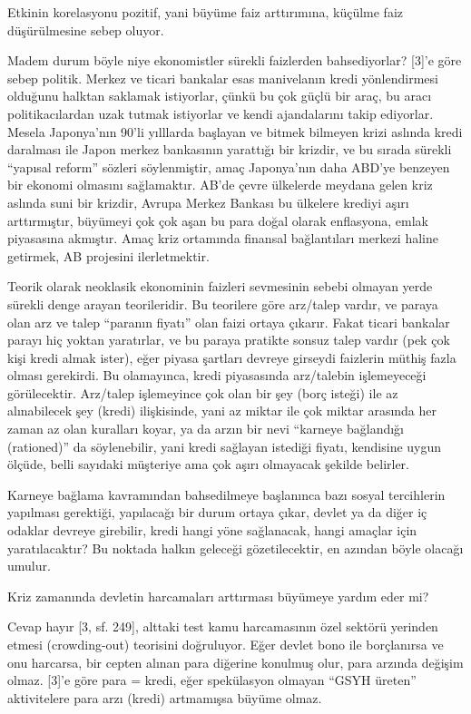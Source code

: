 \documentclass[12pt,fleqn]{article}\usepackage{../../common}
\begin{document}
Etkinin korelasyonu pozitif, yani büyüme faiz arttırımına, küçülme faiz
düşürülmesine sebep oluyor.

Madem durum böyle niye ekonomistler sürekli faizlerden bahsediyorlar? [3]'e
göre sebep politik. Merkez ve ticari bankalar esas manivelanın kredi
yönlendirmesi olduğunu halktan saklamak istiyorlar, çünkü bu çok güçlü bir
araç, bu aracı politikacılardan uzak tutmak istiyorlar ve kendi
ajandalarını takip ediyorlar. Mesela Japonya'nın 90'li yılllarda başlayan
ve bitmek bilmeyen krizi aslında kredi daralması ile Japon merkez
bankasının yarattığı bir krizdir, ve bu sırada sürekli ``yapısal reform''
sözleri söylenmiştir, amaç Japonya'nın daha ABD'ye benzeyen bir ekonomi
olmasını sağlamaktır. AB'de çevre ülkelerde meydana gelen kriz aslında suni
bir krizdir, Avrupa Merkez Bankası bu ülkelere krediyi aşırı arttırmıştır,
büyümeyi çok çok aşan bu para doğal olarak enflasyona, emlak piyasasına
akmıştır. Amaç kriz ortamında finansal bağlantıları merkezi haline
getirmek, AB projesini ilerletmektir.

Teorik olarak neoklasik ekonominin faizleri sevmesinin sebebi olmayan yerde
sürekli denge arayan teorileridir. Bu teorilere göre arz/talep vardır, ve
paraya olan arz ve talep ``paranın fiyatı'' olan faizi ortaya
çıkarır. Fakat ticari bankalar parayı hiç yoktan yaratırlar, ve bu paraya
pratikte sonsuz talep vardır (pek çok kişi kredi almak ister), eğer piyasa
şartları devreye girseydi faizlerin müthiş fazla olması gerekirdi. Bu
olamayınca, kredi piyasasında arz/talebin işlemeyeceği
görülecektir. Arz/talep işlemeyince çok olan bir şey (borç isteği) ile az
alınabilecek şey (kredi) ilişkisinde, yani az miktar ile çok miktar
arasında her zaman az olan kuralları koyar, ya da arzın bir nevi ``karneye
bağlandığı (rationed)'' da söylenebilir, yani kredi sağlayan istediği
fiyatı, kendisine uygun ölçüde, belli sayıdaki müşteriye ama çok aşırı
olmayacak şekilde belirler.

Karneye bağlama kavramından bahsedilmeye başlanınca bazı sosyal
tercihlerin yapılması gerektiği, yapılacağı bir durum ortaya çıkar, devlet
ya da diğer iç odaklar devreye girebilir, kredi hangi yöne sağlanacak,
hangi amaçlar için yaratılacaktır? Bu noktada halkın geleceği
gözetilecektir, en azından böyle olacağı umulur.

Kriz zamanında devletin harcamaları arttırması büyümeye yardım eder mi? 

Cevap hayır [3, sf. 249], alttaki test kamu harcamasının özel sektörü
yerinden etmesi (crowding-out) teorisini doğruluyor. Eğer devlet bono ile
borçlanırsa ve onu harcarsa, bir cepten alınan para diğerine konulmuş olur,
para arzında değişim olmaz. [3]'e göre para = kredi, eğer spekülasyon
olmayan ``GSYH üreten'' aktivitelere para arzı (kredi) artmamışsa büyüme
olmaz.
\end{document}
